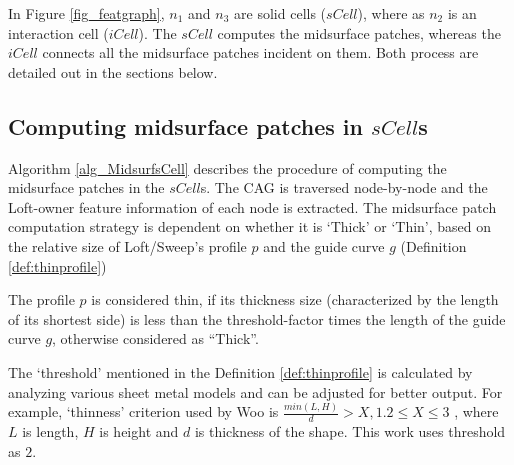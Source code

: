 In Figure \ref{fig_featgraph},  $n_1$ and $n_3$ are solid cells ($sCell$), where as $n_2$ is an interaction cell ($iCell$).  The $sCell$ computes the midsurface patches, whereas the  $iCell$ connects all the midsurface patches incident on them. Both process are detailed out in the sections below.
			


\subsection{Computing midsurface patches in $sCell$s}
\label{sec:scell}
 Algorithm \ref{alg_MidsurfsCell} describes the procedure of computing the midsurface patches in the $sCell$s. The CAG is traversed node-by-node and the Loft-owner feature information of each node is extracted. The midsurface patch computation strategy is dependent on whether it is `Thick' or `Thin', based on the relative size of Loft/Sweep's profile $p$ and the guide curve $g$  (Definition \ref{def:thinprofile})%

\begin{mydef}
\label{def:thinprofile}
The profile $p$ is considered thin, if its thickness size (characterized by the length of its shortest side) is less than the threshold-factor times the length of the guide curve $g$, otherwise considered as ``Thick''.
\end{mydef}

The `threshold' mentioned in the Definition \ref{def:thinprofile} is calculated by analyzing various sheet metal models and can be adjusted for better output. For example, `thinness' criterion used by Woo \cite{Woo2013}  is $\frac{min(L,H)}{d} > X, 1.2 \leq X \leq 3$ , where $L$ is length, $H$ is height and $d$ is thickness of the shape. This work uses threshold as $2$.


